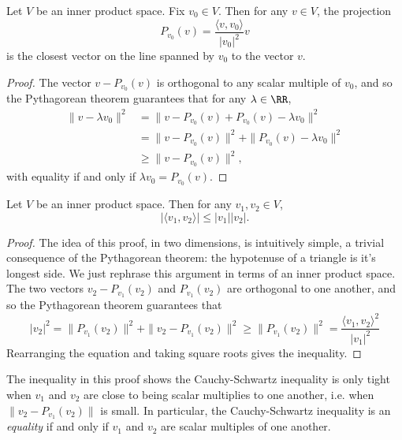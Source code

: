 \begin{corollary}
    Let $V$ be an inner product space. Fix $v_0 \in V$. Then for any $v \in V$, the projection
    \[ P_{v_0}(v) = \frac{\langle v, v_0 \rangle}{|v_0|^2} v \]
    is the closest vector on the line spanned by $v_0$ to the vector $v$.
\end{corollary}
\begin{proof}
    The vector $v - P_{v_0}(v)$ is orthogonal to any scalar multiple of $v_0$, and so the Pythagorean theorem guarantees that for any $\lambda \in \RR$,
    \begin{align*}
        \| v - \lambda v_0 \|^2 &= \| v - P_{v_0}(v) + P_{v_0}(v) - \lambda v_0 \|^2\\
        &= \| v - P_{v_0}(v) \|^2 + \| P_{v_0}(v) - \lambda v_0 \|^2\\
        &\geq \| v - P_{v_0}(v) \|^2,
    \end{align*}
    with equality if and only if $\lambda v_0 = P_{v_0}(v)$.
\end{proof}

\begin{theorem}
    Let $V$ be an inner product space. Then for any $v_1,v_2 \in V$,
    \[ |\langle v_1, v_2 \rangle| \leq |v_1||v_2|. \]
\end{theorem}
\begin{proof}
    The idea of this proof, in two dimensions, is intuitively simple, a trivial consequence of the Pythagorean theorem: the hypotenuse of a triangle is it's longest side. We just rephrase this argument in terms of an inner product space. The two vectors $v_2 - P_{v_1}(v_2)$ and $P_{v_1}(v_2)$ are orthogonal to one another, and so the Pythagorean theorem guarantees that
    \[ |v_2|^2 = \| P_{v_1}(v_2) \|^2 + \| v_2 - P_{v_1}(v_2) \|^2 \geq \| P_{v_1}(v_2) \|^2 = \frac{\langle v_1, v_2 \rangle^2}{|v_1|^2} \]
    Rearranging the equation and taking square roots gives the inequality.
\end{proof}

\begin{remark}
    The inequality in this proof shows the Cauchy-Schwartz inequality is only tight when $v_1$ and $v_2$ are close to being scalar multiplies to one another, i.e. when $\| v_2 - P_{v_1}(v_2) \|$ is small. In particular, the Cauchy-Schwartz inequality is an \emph{equality} if and only if $v_1$ and $v_2$ are scalar multiples of one another.
\end{remark}

